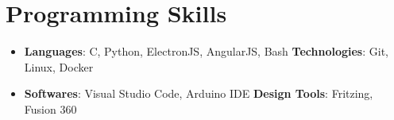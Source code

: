 \documentclass[letterpaper,11pt]{article}
\newcommand{\resumeSubHeadingListStart}{\begin{itemize}[leftmargin=*]}
\newcommand{\resumeSubHeadingListEnd}{\end{itemize}}
\begin{document}
  
\section{Programming Skills}
  	\resumeSubHeadingListStart
    		\item{
      			\textbf{Languages}{: C, Python, ElectronJS, AngularJS, Bash }
      			\hfill
      			\textbf{Technologies}{: Git, Linux, Docker}
    		}
		\item{
      			\textbf{Softwares}{: Visual Studio Code, Arduino IDE}
      			\hfill
      			\textbf{Design Tools}{: Fritzing, Fusion 360}
    		}
  	\resumeSubHeadingListEnd

\end{document}
